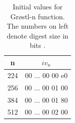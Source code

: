   \begin{table}
    \begin{center}
      \begin{tabular}{ *{2}{c} } \hline
        n   & $iv_{n}$         \\ \hline
        224 & 00 $\dots$ 00 00 e0 \\
        256 & 00 $\dots$ 00 01 00 \\
        384 & 00 $\dots$ 00 01 80 \\
        512 & 00 $\dots$ 00 02 00 \\ \hline
      \end{tabular}
    \caption{Initial values for Gr{\o}stl-n function. The numbers on left denote digest size in bits \cite{00019}.}
    \end{center}
  \end{table}


